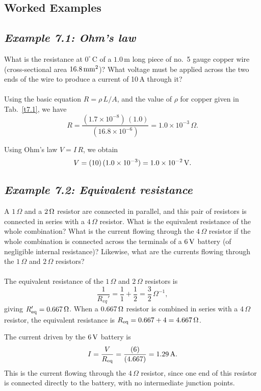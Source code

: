 \subsection{Worked Examples}
\subsection*{\em Example 7.1: Ohm's law}
 What is the resistance at $0^\circ$\,C of a $1.0$\,m
long piece of no.~5 gauge copper wire (cross-sectional area $16.8\,{\rm mm}^2$)?
What voltage must be applied across the two ends of the wire to produce a
current of 10\,A through it?\\
~\\
 Using the basic equation $R=\rho\,L/A$, and the
value of $\rho$ for copper given in Tab.~\ref{t7.1}, we have
$$
R = \frac{(1.7\times 10^{-8})\,(1.0)}{(16.8\times 10^{-6})} = 1.0\times 10^{-3}\,
\Omega.
$$

Using Ohm's law $V=I\,R$, we obtain
$$
V = (10)\, (1.0\times 10^{-3}) = 1.0\times 10^{-2} \,{\rm V}.
$$

\subsection*{\em Example 7.2: Equivalent resistance}
\begin{figure*}[h]
\epsfysize=2.5in
\centerline{}
\end{figure*}
 A $1\,\Omega$ and a $2\,{\rm \Omega}$ resistor are connected in parallel,
and this pair of resistors is connected in series with a $4\,\Omega$ resistor.
What is the equivalent resistance of the whole combination? What is the
current flowing through the $4\,\Omega$ resistor if the whole combination is
connected across the terminals of a $6\,{\rm V}$ battery (of negligible
internal resistance)? Likewise, what are the currents flowing through the
$1\,\Omega$  and $2\,\Omega$ resistors?\\
~\\
 The equivalent resistance of the
 $1\,\Omega$  and $2\,\Omega$ resistors is
$$
\frac{1}{R_{eq}'} = \frac{1}{1} + \frac{1}{2} = \frac{3}{2}\,\Omega^{-1},
$$
giving $R_{\rm eq}' = 0.667\,{\rm \Omega}$. When a $0.667\,{\rm \Omega}$
resistor is combined in series with a $4\,\Omega$ resistor, the
equivalent resistance is $R_{\rm eq} = 0.667 + 4 = 4.667\,\Omega$. 

The current driven by the $6\,{\rm V}$ battery is
$$
I = \frac{V}{R_{\rm eq}} = \frac{(6)}{(4.667)} = 1.29\,{\rm A}.
$$
This is the current flowing through the $4\,\Omega$ resistor, since one end of
this resistor is connected directly to the battery, with no intermediate
junction points. 

